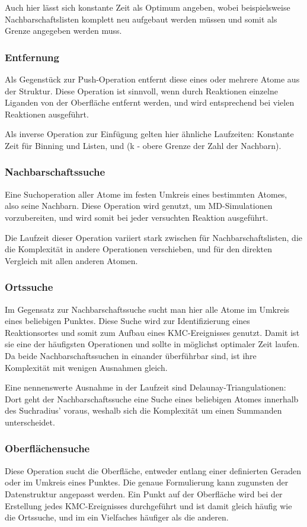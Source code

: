 Auch hier lässt sich konstante Zeit als Optimum angeben, wobei beispielsweise Nachbarschaftslisten komplett neu aufgebaut werden müssen und somit  als Grenze angegeben werden muss.

\subsubsection{Entfernung}
Als Gegenstück zur Push-Operation entfernt diese eines oder mehrere Atome aus der Struktur.
Diese Operation ist sinnvoll, wenn durch Reaktionen einzelne Liganden von der Oberfläche entfernt werden, und wird entsprechend bei vielen Reaktionen ausgeführt.

Als inverse Operation zur Einfügung gelten hier ähnliche Laufzeiten:
Konstante Zeit für Binning und Listen, und  (k - obere Grenze der Zahl der Nachbarn).

\subsubsection{Nachbarschaftssuche}
Eine Suchoperation aller Atome im festen Umkreis eines bestimmten Atomes, also seine Nachbarn.
Diese Operation wird genutzt, um MD-Simulationen vorzubereiten, und wird somit bei jeder versuchten Reaktion ausgeführt.

Die Laufzeit dieser Operation variiert stark zwischen  für Nachbarschaftslisten, die die Komplexität in andere Operationen verschieben, und  für den direkten Vergleich mit allen anderen Atomen.

\subsubsection{Ortssuche}
Im Gegensatz zur Nachbarschaftssuche sucht man hier alle Atome im Umkreis eines beliebigen Punktes.
Diese Suche wird zur Identifizierung eines Reaktionsortes und somit zum Aufbau eines KMC-Ereignisses genutzt.
Damit ist sie eine der häufigsten Operationen und sollte in möglichst optimaler Zeit laufen.
Da beide Nachbarschaftssuchen in einander überführbar sind, ist ihre Komplexität mit wenigen Ausnahmen gleich.

Eine nennenswerte Ausnahme in der Laufzeit sind Delaunay-Triangulationen:
Dort geht der Nachbarschaftssuche eine Suche eines beliebigen Atomes innerhalb des Suchradius' voraus, weshalb sich die Komplexität um einen Summanden unterscheidet.

\subsubsection{Oberflächensuche}
Diese Operation sucht die Oberfläche, entweder entlang einer definierten Geraden oder im Umkreis eines Punktes.
Die genaue Formulierung kann zugunsten der Datenstruktur angepasst werden.
Ein Punkt auf der Oberfläche wird bei der Erstellung jedes KMC-Ereignisses durchgeführt und ist damit gleich häufig wie die Ortssuche, und im ein Vielfaches häufiger als die anderen.

